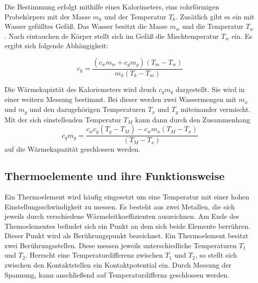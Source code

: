 Die Bestimmung erfolgt mithilfe eines Kalorimeters,
eins rohrförmigen Probekörpers mit der Masse $m_k$ und der Temperatur 
$T_k$. Zusätlich gibt es ein mit Wasser gefülltes Gefäß.
Das Wasser besitzt die Masse $m_w$ und die Temperatur $T_w$.
Nach eintauchen de Körper stellt sich im Gefäß die 
Mischtemperatur $T_w$ ein. 
Es ergibt sich folgende Abhängigkeit:

\begin{equation*}
\label{eq:zusammenhang_ck}
c_k=\frac{\left(c_wm_w+c_gm_g\right)\left(T_m-T_w\right)}{m_k\left(T_k-T_m\right)}
\end{equation*}

Die Wärmekapiztät des Kaloriemeters wird  druch $c_gm_g$ dargestellt.
Sie wird in einer weitern Messung bestimmt.
Bei dieser werden zwei Wassermengen mit $m_x$ und $m_y$ und den 
dazugehörigen Temperaturen $T_x$ und $T_y$ miteinander vermischt.
Mit der sich einstellenden Temperatur $T_M$ kann dann
durch den Zusammenhang
\begin{equation}
\label{eq:zusammenhang_cgmg}
c_gm_g=\frac{c_wc_y\left(T_y-T_M\right)-c_wm_x\left(T_M-T_x\right)}{\left(T_M-T_x\right)}
\end{equation}
auf die Wärmekapazität geschlossen werden.

\subsection{Thermoelemente und ihre Funktionsweise} %

Ein Thermoelement wird häufig eingesetzt um eine  
Temperatur mit einer hohen Einstellungsschwindigkeit zu messen.
Es besteht aus zwei Metallen, die sich jeweils durch
verschiedene Wärmeleitkoeffizienten auszeichnen.
Am Ende des Themoelementes befindet sich ein Punkt an dem sich
beide Elemente berrühren. Dieser Punkt wird als Berührungspunkt 
bezeichnet.
Ein Thermoelement besitzt zwei Berührungsstellen.
Diese messen jeweils unterschiedliche Temperaturen $T_1$ und $T_2$.
Herrscht eine Temperaturdifferenz zwischen $T_1$ und $T_2$, so 
stellt sich zwischen den Kontaktstellen ein Kontaktpotential 
ein. 
Durch Messung der Spannung, kann anschließend auf 
Temperaturdiffernz geschlossen werden.







